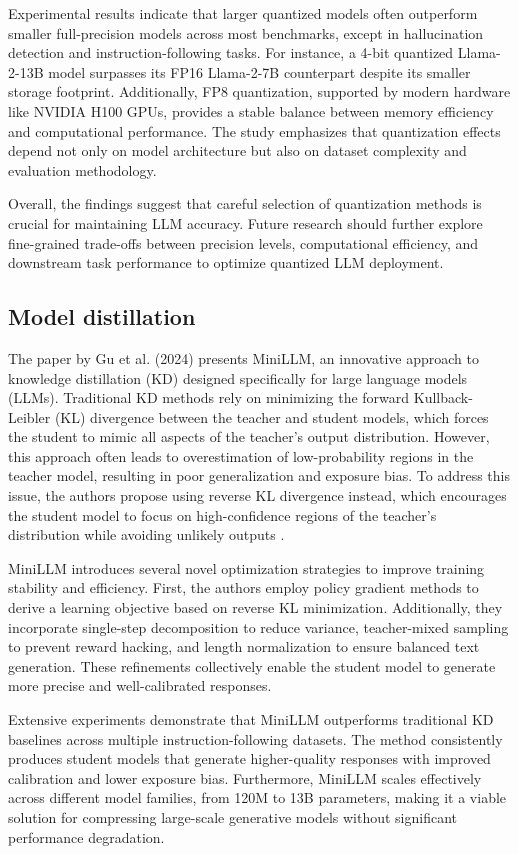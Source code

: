 Experimental results indicate that larger quantized models often outperform smaller full-precision models across most benchmarks, except in hallucination detection and instruction-following tasks. For instance, a 4-bit quantized Llama-2-13B model surpasses its FP16 Llama-2-7B counterpart despite its smaller storage footprint. Additionally, FP8 quantization, supported by modern hardware like NVIDIA H100 GPUs, provides a stable balance between memory efficiency and computational performance. The study emphasizes that quantization effects depend not only on model architecture but also on dataset complexity and evaluation methodology.

Overall, the findings suggest that careful selection of quantization methods is crucial for maintaining LLM accuracy. Future research should further explore fine-grained trade-offs between precision levels, computational efficiency, and downstream task performance to optimize quantized LLM deployment.

\subsection{Model distillation}
The paper by Gu et al. (2024) presents MiniLLM, an innovative approach to knowledge distillation (KD) designed specifically for large language models (LLMs). Traditional KD methods rely on minimizing the forward Kullback-Leibler (KL) divergence between the teacher and student models, which forces the student to mimic all aspects of the teacher’s output distribution. However, this approach often leads to overestimation of low-probability regions in the teacher model, resulting in poor generalization and exposure bias. To address this issue, the authors propose using reverse KL divergence instead, which encourages the student model to focus on high-confidence regions of the teacher's distribution while avoiding unlikely outputs \cite{21}.

MiniLLM introduces several novel optimization strategies to improve training stability and efficiency. First, the authors employ policy gradient methods to derive a learning objective based on reverse KL minimization. Additionally, they incorporate single-step decomposition to reduce variance, teacher-mixed sampling to prevent reward hacking, and length normalization to ensure balanced text generation. These refinements collectively enable the student model to generate more precise and well-calibrated responses.

Extensive experiments demonstrate that MiniLLM outperforms traditional KD baselines across multiple instruction-following datasets. The method consistently produces student models that generate higher-quality responses with improved calibration and lower exposure bias. Furthermore, MiniLLM scales effectively across different model families, from 120M to 13B parameters, making it a viable solution for compressing large-scale generative models without significant performance degradation.

